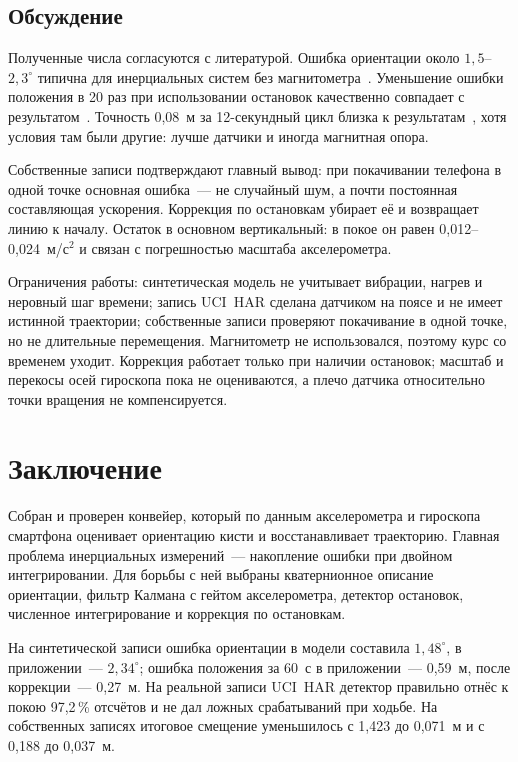 \documentclass{misisarticle}
\begin{document}
\subsection{Обсуждение}

Полученные числа согласуются с литературой. Ошибка ориентации около $1{,}5$--$2{,}3^\circ$ типична для инерциальных систем без магнитометра~\cite{woodman,zhilin}. Уменьшение ошибки положения в 20 раз при использовании остановок качественно совпадает с результатом~\cite{neto}. Точность 0,08~м за 12-секундный цикл близка к результатам~\cite{neto,kortier}, хотя условия там были другие: лучше датчики и иногда магнитная опора.

Собственные записи подтверждают главный вывод: при покачивании телефона в одной точке основная ошибка~--- не случайный шум, а почти постоянная составляющая ускорения. Коррекция по остановкам убирает её и возвращает линию к началу. Остаток в основном вертикальный: в покое он равен 0,012--0,024~м/с$^2$ и связан с погрешностью масштаба акселерометра.

Ограничения работы: синтетическая модель не учитывает вибрации, нагрев и неровный шаг времени; запись UCI~HAR сделана датчиком на поясе и не имеет истинной траектории; собственные записи проверяют покачивание в одной точке, но не длительные перемещения. Магнитометр не использовался, поэтому курс со временем уходит. Коррекция работает только при наличии остановок; масштаб и перекосы осей гироскопа пока не оцениваются, а плечо датчика относительно точки вращения не компенсируется.

\section{Заключение}

Собран и проверен конвейер, который по данным акселерометра и гироскопа смартфона оценивает ориентацию кисти и восстанавливает траекторию. Главная проблема инерциальных измерений~--- накопление ошибки при двойном интегрировании. Для борьбы с ней выбраны кватернионное описание ориентации, фильтр Калмана с гейтом акселерометра, детектор остановок, численное интегрирование и коррекция по остановкам.

На синтетической записи ошибка ориентации в модели составила $1{,}48^\circ$, в приложении~--- $2{,}34^\circ$; ошибка положения за 60~с в приложении~--- 0,59~м, после коррекции~--- 0,27~м. На реальной записи UCI~HAR детектор правильно отнёс к покою 97,2\,\% отсчётов и не дал ложных срабатываний при ходьбе. На собственных записях итоговое смещение уменьшилось с 1,423 до 0,071~м и с 0,188 до 0,037~м.
\end{document}
